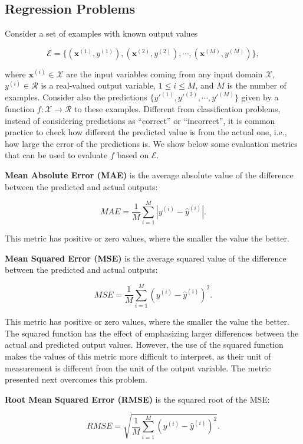 \subsection{Regression Problems}
\label{sec:eval-metrics-regression}

Consider a set of examples with known output values 

\[\mathcal{E} = \{(\mathbf{x}^{(1)},y^{(1)}), (\mathbf{x}^{(2)},y^{(2)}), \cdots, (\mathbf{x}^{(M)},y^{(M)})\},\] 

\noindent where $\mathbf{x}^{(i)} \in \mathcal{X}$ are the input variables coming from any input domain $\mathcal{X}$, $y^{(i)} \in \mathcal{R}$ is a real-valued output variable, $1 \leq i \leq M$, and $M$ is the number of examples.  Consider also the predictions $\{y'^{(1)},y'^{(2)}, \cdots, y'^{(M)}\}$ given by a function $f: \mathcal{X} \rightarrow \mathcal{R}$ to these examples. Different from classification problems, instead of considering predictions as ``correct'' or ``incorrect'', it is common practice to check how different the predicted value is from the actual one, i.e., how large the error of the predictions is.  We show below some evaluation metrics that can be used to evaluate $f$ based on $\mathcal{E}$. 

\textbf{Mean Absolute Error (MAE)} is the average absolute value of the difference between the predicted and actual outputs:

\[ MAE = \frac{1}{M} \sum_{i=1}^M |y^{(i)} - \hat{y}^{(i)}|.\]

\noindent This metric has positive or zero values, where the smaller the value the better. 

\textbf{Mean Squared Error (MSE)} is the average squared value of the difference between the predicted and actual outputs:

\[ MSE = \frac{1}{M} \sum_{i=1}^M (y^{(i)} - \hat{y}^{(i)})^2.\]

\noindent This metric has positive or zero values, where the smaller the value the better. The squared function has the effect of emphasizing larger differences between the actual and predicted output values. However, the use of the squared function makes the values of this metric more difficult to interpret, as their unit of measurement is different from the unit of the output variable. The metric presented next overcomes this problem.

\textbf{Root Mean Squared Error (RMSE)} is the squared root of the MSE:

\[ RMSE = \sqrt{\frac{1}{M} \sum_{i=1}^M (y^{(i)} - \hat{y}^{(i)})^2}.\]

